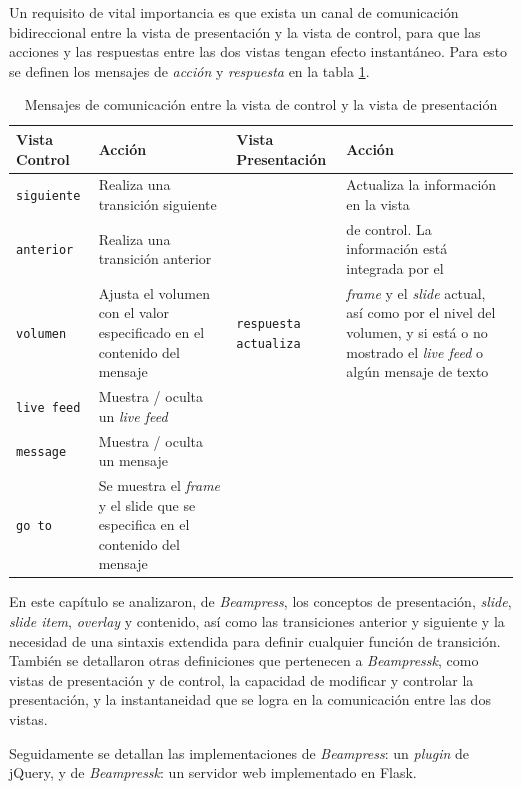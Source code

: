 		Un requisito de vital importancia es que exista un canal de comunicación bidireccional entre la vista de presentación y la vista de control, para que las acciones y las respuestas entre las dos vistas tengan efecto instantáneo. Para esto se definen los mensajes de \textit{acción} y \textit{respuesta} en la tabla \ref{tab:messages}.

			\begin{table}[b]
				\caption{Mensajes de comunicación entre la vista de control y la vista de presentación}
				\label{tab:messages}
				\centering
			
				\begin{tabular}{| m{2cm} | m{3cm} | m{2.5cm} | m{3cm} |}
				\hline
			
				\hline
					\textbf{Vista Control} & \textbf{Acción} & \textbf{Vista \newline Presentación} & \textbf{Acción} \\
				\hline
					\texttt{siguiente} & Realiza una transición siguiente &  & Actualiza la información en la vista  \\ \cline{1-2}
					\texttt{anterior} & Realiza una transición anterior &   & de control. La información está integrada por el \\ \cline{1-2}

					\texttt{volumen} & Ajusta el volumen con el valor especificado en el contenido del mensaje & \texttt{respuesta actualiza} & \textit{frame} y el \textit{slide} actual, así como por el nivel del volumen, y si está o no mostrado el \textit{live feed} o algún mensaje de texto \\ \cline{1-2}

					\texttt{live feed} & Muestra / oculta un \textit{live feed} &  &  \\ \cline{1-2}

					\texttt{message} & Muestra / oculta un mensaje &  &  \\ \cline{1-2}

					\texttt{go to} & Se muestra el \textit{frame} y el slide que se especifica en el contenido del mensaje &  &  \\ 
				\hline																																
			
				\hline
				\end{tabular}
			\end{table}	


		En este capítulo se analizaron, de \textit{Beampress}, los conceptos de presentación, \textit{slide}, \textit{slide item}, \textit{overlay} y contenido, así como las transiciones anterior y siguiente y la necesidad de una sintaxis extendida para definir cualquier función de transición. También se detallaron otras definiciones que pertenecen a \textit{Beampressk}, como vistas de presentación y de control, la capacidad de modificar y controlar la presentación, y la instantaneidad que se logra en la comunicación entre las dos vistas.

		Seguidamente se detallan las implementaciones de \textit{Beampress}: un \textit{plugin} de jQuery, y de \textit{Beampressk}: un servidor web implementado en Flask.


	





